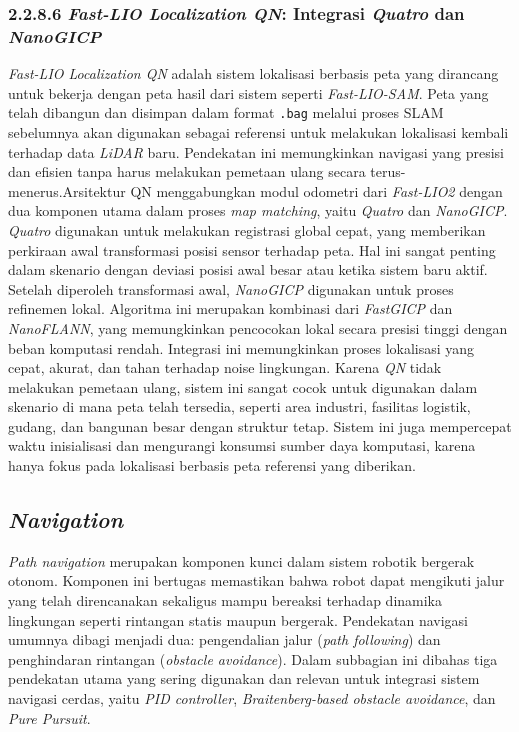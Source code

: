 \subsubsection{2.2.8.6 \emph{Fast-LIO Localization QN}: Integrasi \emph{Quatro} dan \emph{NanoGICP}}

\emph{Fast-LIO Localization QN} adalah sistem lokalisasi berbasis peta yang dirancang untuk bekerja dengan peta hasil dari sistem seperti \emph{Fast-LIO-SAM}. Peta yang telah dibangun dan disimpan dalam format \texttt{.bag} melalui proses SLAM sebelumnya akan digunakan sebagai referensi untuk melakukan lokalisasi kembali terhadap data \emph{LiDAR} baru. Pendekatan ini memungkinkan navigasi yang presisi dan efisien tanpa harus melakukan pemetaan ulang secara terus-menerus.Arsitektur QN menggabungkan modul odometri dari \emph{Fast-LIO2} dengan dua komponen utama dalam proses \emph{map matching}, yaitu \emph{Quatro} dan \emph{NanoGICP}. \emph{Quatro} digunakan untuk melakukan registrasi global cepat, yang memberikan perkiraan awal transformasi posisi sensor terhadap peta. Hal ini sangat penting dalam skenario dengan deviasi posisi awal besar atau ketika sistem baru aktif. Setelah diperoleh transformasi awal, \emph{NanoGICP} digunakan untuk proses refinemen lokal. Algoritma ini merupakan kombinasi dari \emph{FastGICP} dan \emph{NanoFLANN}, yang memungkinkan pencocokan lokal secara presisi tinggi dengan beban komputasi rendah. Integrasi ini memungkinkan proses lokalisasi yang cepat, akurat, dan tahan terhadap noise lingkungan. Karena \emph{QN} tidak melakukan pemetaan ulang, sistem ini sangat cocok untuk digunakan dalam skenario di mana peta telah tersedia, seperti area industri, fasilitas logistik, gudang, dan bangunan besar dengan struktur tetap. Sistem ini juga mempercepat waktu inisialisasi dan mengurangi konsumsi sumber daya komputasi, karena hanya fokus pada lokalisasi berbasis peta referensi yang diberikan\cite{fastlio2023qnloc}.


\subsection{\emph{Navigation}}
\emph{Path navigation} merupakan komponen kunci dalam sistem robotik bergerak otonom. Komponen ini bertugas memastikan bahwa robot dapat mengikuti jalur yang telah direncanakan sekaligus mampu bereaksi terhadap dinamika lingkungan seperti rintangan statis maupun bergerak. Pendekatan navigasi umumnya dibagi menjadi dua: pengendalian jalur (\emph{path following}) dan penghindaran rintangan (\emph{obstacle avoidance}). Dalam subbagian ini dibahas tiga pendekatan utama yang sering digunakan dan relevan untuk integrasi sistem navigasi cerdas, yaitu \emph{PID controller}, \emph{Braitenberg-based obstacle avoidance}, dan \emph{Pure Pursuit}.

